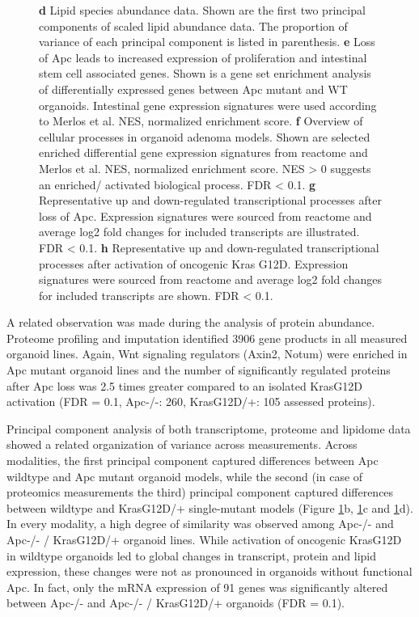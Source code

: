 \begin{flushleft}
\begin{figure}[h]
{\textbf{d} Lipid species abundance data. Shown are the first two principal components of scaled lipid abundance data. The proportion of variance of each principal component is listed in parenthesis. 
\textbf{e} Loss of Apc leads to increased expression of proliferation and intestinal stem cell associated genes. Shown is a gene set enrichment analysis of differentially expressed genes between Apc mutant and WT organoids. Intestinal gene expression signatures were used according to Merlos et al. NES, normalized enrichment score. 
\textbf{f} Overview of cellular processes in organoid adenoma models. Shown are selected enriched differential gene expression signatures from reactome and Merlos et al. NES, normalized enrichment score. NES > 0 suggests an enriched/ activated biological process. FDR < 0.1. 
\textbf{g} Representative up and down-regulated transcriptional processes after loss of Apc. Expression signatures were sourced from reactome and average log2 fold changes for included transcripts are illustrated. FDR < 0.1.
\textbf{h} Representative up and down-regulated transcriptional processes after activation of oncogenic Kras G12D. Expression signatures were sourced from reactome and average log2 fold changes for included transcripts are shown. FDR < 0.1.}
\label{fig_160}
\end{figure}
\bigbreak


A related observation was made during the analysis of protein abundance. Proteome profiling and imputation identified 3906 gene products in all measured organoid lines. Again, Wnt signaling regulators (Axin2, Notum) were enriched in Apc mutant organoid lines and the number of significantly regulated proteins after Apc loss was 2.5 times greater compared to an isolated KrasG12D activation (FDR = 0.1, Apc-/-: 260, KrasG12D/+: 105 assessed proteins). 

Principal component analysis of both transcriptome, proteome and lipidome data showed a related organization of variance across measurements. Across modalities, the first principal component captured differences between Apc wildtype and Apc mutant organoid models, while the second (in case of proteomics measurements the third) principal component captured differences between wildtype and KrasG12D/+ single-mutant models (Figure \ref{fig_160}b, \ref{fig_160}c and \ref{fig_160}d). In every modality, a high degree of similarity was observed among Apc-/- and Apc-/- / KrasG12D/+ organoid lines. While activation of oncogenic KrasG12D in wildtype organoids led to global changes in transcript, protein and lipid expression, these changes were not as pronounced in organoids without functional Apc. In fact, only the mRNA expression of 91 genes was significantly altered between Apc-/- and Apc-/- / KrasG12D/+ organoids (FDR = 0.1). 


\end{flushleft}
